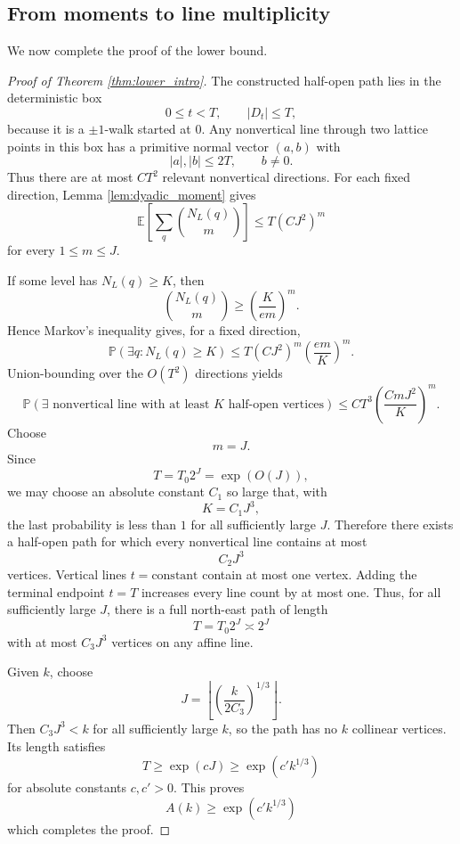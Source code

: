 \documentclass[10pt,a4paper]{amsart}
\newcommand{\E}{\mathbb E}
\newcommand{\Pp}{\mathbb P}
\newcommand{\1}{\mathbf 1}
\begin{document}
\subsection{From moments to line multiplicity}

We now complete the proof of the lower bound.


\begin{proof}[Proof of Theorem \ref{thm:lower_intro}]
The constructed half-open path lies in the deterministic box
\[
0\le t<T,
\qquad |D_t|\le T,
\]
because it is a $\pm1$-walk started at $0$.  Any nonvertical line through two lattice points in this box has a primitive normal vector $(a,b)$ with
\[
|a|,|b|\le 2T,
\qquad b\ne0.
\]
Thus there are at most $CT^2$ relevant nonvertical directions.  For each fixed direction, Lemma \ref{lem:dyadic_moment} gives
\[
\E\left[\sum_q\binom{N_L(q)}{m}\right] \le T(CJ^2)^m
\]
for every $1\le m\le J$.

\bigskip
\noindent
If some level has $N_L(q)\ge K$, then
\[
\binom{N_L(q)}{m}\ge \left(\frac{K}{em}\right)^m.
\]
Hence Markov's inequality gives, for a fixed direction,
\[
\Pp(\exists q:N_L(q)\ge K)
\le
T(CJ^2)^m\left(\frac{em}{K}\right)^m.
\]
Union-bounding over the $O(T^2)$ directions yields
\[
\Pp(\exists\text{ nonvertical line with at least }K
\text{ half-open vertices})
\le
CT^3\left(\frac{CmJ^2}{K}\right)^m.
\]
Choose
\[
m=J.
\]
Since
\[
T=T_0 2^J=\exp(O(J)),
\]
we may choose an absolute constant $C_1$ so large that, with
\[
K=C_1J^3,
\]
the last probability is less than $1$ for all sufficiently large $J$. Therefore there exists a half-open path for which every nonvertical line
contains at most
\[
C_2J^3
\]
vertices.  Vertical lines $t=\text{constant}$ contain at most one vertex. Adding the terminal endpoint $t=T$ increases every line count by at most one.  Thus, for all sufficiently large $J$, there is a full north-east path of length
\[
T=T_0 2^J\asymp 2^J
\]
with at most $C_3J^3$ vertices on any affine line.

\bigskip
\noindent
Given $k$, choose
\[
J=\left\lfloor \left(\frac{k}{2C_3}\right)^{1/3}\right\rfloor.
\]
Then $C_3J^3<k$ for all sufficiently large $k$, so the path has no $k$ collinear vertices.  Its length satisfies
\[
T\ge \exp(cJ)\ge \exp(c'k^{1/3})
\]
for absolute constants $c,c'>0$.  This proves
\[
A(k)\ge \exp(c'k^{1/3})
\]
which completes the proof.
\end{proof}
\end{document}

